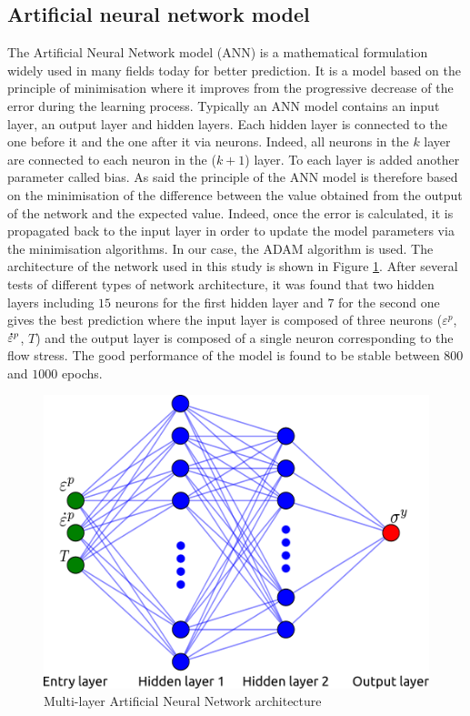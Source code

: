 \documentclass[twoside,english,1p,final,sort&compress]{elsarticle}
\theoremstyle{plain}
\newcommand{\mdot}[1]{\accentset{\mbox{\bfseries .}}{#1}}
\begin{document}
\subsection{Artificial neural network model\label{sec:ANNmodel}}
The Artificial Neural Network model (ANN) is a mathematical formulation widely used in many fields today for better prediction. It is a model based on the principle of minimisation where it improves from the progressive decrease of the error during the learning process. Typically an ANN model contains an input layer, an output layer and hidden layers. Each hidden layer is connected to the one before it and the one after it via neurons. Indeed, all neurons in the $k$ layer are connected to each neuron in the ($k+1$) layer. To each layer is added another parameter called bias. As said the principle of the ANN model is therefore based on the minimisation of the difference between the value obtained from the output of the network and the expected value.  Indeed, once the error is calculated, it is propagated back to the input layer in order to update the model parameters via the minimisation algorithms. In our case, the ADAM algorithm is used. The architecture of the network used in this study is shown in Figure \ref{fig:ANN-scheme-2HL}. After several tests of different types of network architecture, it was found that two hidden layers including $15$ neurons for the first hidden layer and $7$ for the second one gives the best prediction where the input layer is composed of three neurons ($\varepsilon^p$, $\mdot\varepsilon^p$, $T$) and the output layer is composed of a single neuron corresponding to the flow stress. The good performance of the model is found to be stable between $800$ and $1000$ epochs.

\begin{figure}[!ht]
\centering
\includegraphics[width=0.7\columnwidth]
{Figures/ANN-scheme-2HL}
\caption{Multi-layer Artificial Neural Network architecture}
\label{fig:ANN-scheme-2HL}
\end{figure}
\end{document}
